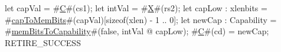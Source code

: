 let capVal = #\hyperref[sailRISCVzC]{C}#(cs1);
let intVal = #\hyperref[sailRISCVzX]{X}#(rs2);
let capLow : xlenbits = #\hyperref[sailRISCVzcapToMemBits]{capToMemBits}#(capVal)[sizeof(xlen) - 1 .. 0];
let newCap : Capability = #\hyperref[sailRISCVzmemBitsToCapability]{memBitsToCapability}#(false, intVal @ capLow);
#\hyperref[sailRISCVzC]{C}#(cd) = newCap;
RETIRE_SUCCESS
